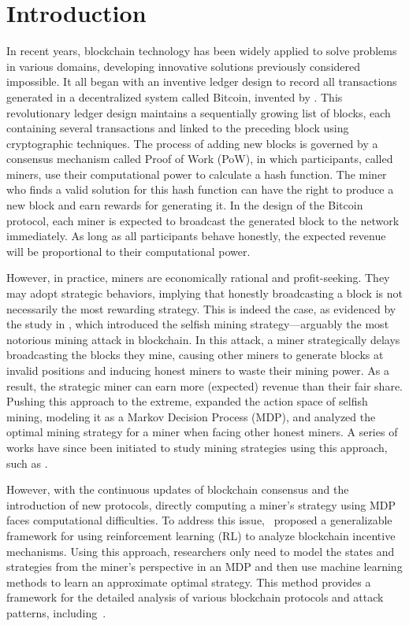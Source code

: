 \section{Introduction}
\label{sec:intro}
In recent years, blockchain technology has been widely applied to solve problems in various domains, developing innovative solutions previously considered impossible.  
It all began with an inventive ledger design to record all transactions generated in a decentralized system called Bitcoin, invented by \cite{nakamoto2008bitcoin}.  
This revolutionary ledger design maintains a sequentially growing list of blocks, each containing several transactions and linked to the preceding block using cryptographic techniques.  
The process of adding new blocks is governed by a consensus mechanism called Proof of Work (PoW), in which participants, called miners, use their computational power to calculate a hash function.
The miner who finds a valid solution for this hash function can have the right to produce a new block and earn rewards for generating it.  
In the design of the Bitcoin protocol, each miner is expected to broadcast the generated block to the network immediately.  
As long as all participants behave honestly, the expected revenue will be proportional to their computational power.  

However, in practice, miners 
are economically rational and profit-seeking.
They may adopt strategic behaviors, implying that honestly broadcasting a block is not necessarily the most rewarding strategy.
This is indeed the case, as evidenced by the study in \cite{eyal2014majority}, which introduced the selfish mining strategy—arguably the most notorious mining attack in blockchain.
In this attack, a miner strategically delays broadcasting the blocks they mine, causing other miners to generate blocks at invalid positions and inducing honest miners to waste their mining power.  
As a result, the strategic miner can earn more (expected) revenue than their fair share. 
Pushing this approach to the extreme, \cite{sapirshtein2016optimal} expanded the action space of selfish mining, modeling it as a Markov Decision Process (MDP), and analyzed the optimal mining strategy for a miner when facing other honest miners.  
A series of works have since been initiated to study mining strategies using this approach, such as \cite{feng2019selfish,grunspan2020selfish,li2021new,ferreira2022optimal}.  

However, with the continuous updates of blockchain consensus and the introduction of new protocols, directly computing a miner's strategy using MDP faces computational difficulties. 
To address this issue,~\cite{hou2019squirrl} proposed a generalizable framework for using reinforcement learning (RL) to analyze blockchain incentive mechanisms.  
Using this approach, researchers only need to model the states and strategies from the miner's perspective in an MDP and then use machine learning methods to learn an approximate optimal strategy.  
This method provides a framework for the detailed analysis of various blockchain protocols and attack patterns, including~\cite{bar2022werlman,bar2023deep,sarenche2024deep}.

